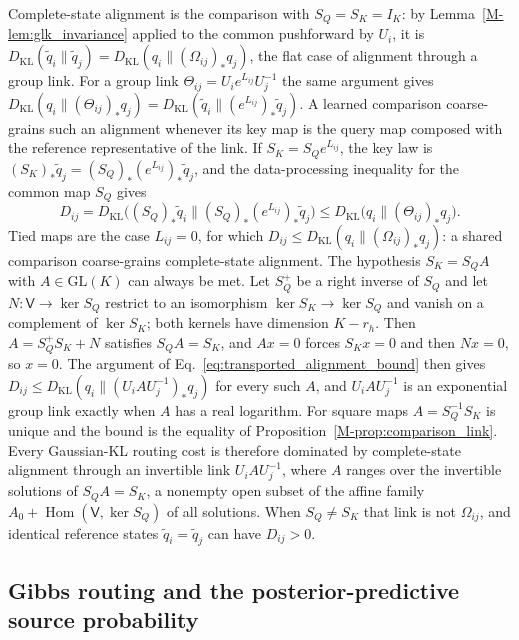 \documentclass[twoside,11pt]{article}
\begin{document}
Complete-state alignment is the comparison with $S_Q=S_K=I_K$: by Lemma~\ref{M-lem:glk_invariance} applied to the common pushforward by $U_i$, it is $D_{\mathrm{KL}}(\widetilde q_i\|\widetilde q_j)=D_{\mathrm{KL}}(q_i\|(\Omega_{ij})_*q_j)$, the flat case of alignment through a group link. For a group link $\Theta_{ij}=U_ie^{L_{ij}}U_j^{-1}$ the same argument gives $D_{\mathrm{KL}}(q_i\|(\Theta_{ij})_*q_j)=D_{\mathrm{KL}}(\widetilde q_i\|(e^{L_{ij}})_*\widetilde q_j)$. A learned comparison coarse-grains such an alignment whenever its key map is the query map composed with the reference representative of the link. If $S_K=S_Qe^{L_{ij}}$, the key law is $(S_K)_*\widetilde q_j=(S_Q)_*(e^{L_{ij}})_*\widetilde q_j$, and the data-processing inequality for the common map $S_Q$ \citep[Thm.~9]{vanErvenHarremoes2014} gives
\begin{equation}
D_{ij}=D_{\mathrm{KL}}\bigl((S_Q)_*\widetilde q_i\|(S_Q)_*(e^{L_{ij}})_*\widetilde q_j\bigr)
\le D_{\mathrm{KL}}\bigl(q_i\|(\Theta_{ij})_*q_j\bigr).
\label{eq:transported_alignment_bound}
\end{equation}
Tied maps are the case $L_{ij}=0$, for which $D_{ij}\le D_{\mathrm{KL}}(q_i\|(\Omega_{ij})_*q_j)$: a shared comparison coarse-grains complete-state alignment. The hypothesis $S_K=S_QA$ with $A\in\mathrm{GL}(K)$ can always be met. Let $S_Q^+$ be a right inverse of $S_Q$ and let $N:\mathsf V\to\ker S_Q$ restrict to an isomorphism $\ker S_K\to\ker S_Q$ and vanish on a complement of $\ker S_K$; both kernels have dimension $K-r_h$. Then $A=S_Q^+S_K+N$ satisfies $S_QA=S_K$, and $Ax=0$ forces $S_Kx=0$ and then $Nx=0$, so $x=0$. The argument of Eq.~\eqref{eq:transported_alignment_bound} then gives $D_{ij}\le D_{\mathrm{KL}}(q_i\|(U_iAU_j^{-1})_*q_j)$ for every such $A$, and $U_iAU_j^{-1}$ is an exponential group link exactly when $A$ has a real logarithm. For square maps $A=S_Q^{-1}S_K$ is unique and the bound is the equality of Proposition~\ref{M-prop:comparison_link}. Every Gaussian-KL routing cost is therefore dominated by complete-state alignment through an invertible link $U_iAU_j^{-1}$, where $A$ ranges over the invertible solutions of $S_QA=S_K$, a nonempty open subset of the affine family $A_0+\operatorname{Hom}(\mathsf V,\ker S_Q)$ of all solutions. When $S_Q\ne S_K$ that link is not $\Omega_{ij}$, and identical reference states $\widetilde q_i=\widetilde q_j$ can have $D_{ij}>0$.

\subsection{Gibbs routing and the posterior-predictive source probability}
\label{supp:posterior_predictive}
\end{document}
